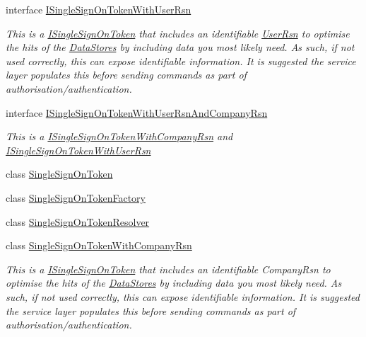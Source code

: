 \begin{DoxyCompactItemize}
interface \hyperlink{interfaceCqrs_1_1Authentication_1_1ISingleSignOnTokenWithUserRsn}{I\+Single\+Sign\+On\+Token\+With\+User\+Rsn}
\begin{DoxyCompactList}\small\item\em This is a \hyperlink{interfaceCqrs_1_1Authentication_1_1ISingleSignOnToken}{I\+Single\+Sign\+On\+Token} that includes an identifiable \hyperlink{interfaceCqrs_1_1Authentication_1_1ISingleSignOnTokenWithUserRsn_a3ba8dbde50e032ebc76c96a5ff40f47f}{User\+Rsn} to optimise the hits of the \hyperlink{}{Data\+Stores} by including data you most likely need. As such, if not used correctly, this can expose identifiable information. It is suggested the service layer populates this before sending commands as part of authorisation/authentication. \end{DoxyCompactList}\item 
interface \hyperlink{interfaceCqrs_1_1Authentication_1_1ISingleSignOnTokenWithUserRsnAndCompanyRsn}{I\+Single\+Sign\+On\+Token\+With\+User\+Rsn\+And\+Company\+Rsn}
\begin{DoxyCompactList}\small\item\em This is a \hyperlink{interfaceCqrs_1_1Authentication_1_1ISingleSignOnTokenWithCompanyRsn}{I\+Single\+Sign\+On\+Token\+With\+Company\+Rsn} and \hyperlink{interfaceCqrs_1_1Authentication_1_1ISingleSignOnTokenWithUserRsn}{I\+Single\+Sign\+On\+Token\+With\+User\+Rsn} \end{DoxyCompactList}\item 
class \hyperlink{classCqrs_1_1Authentication_1_1SingleSignOnToken}{Single\+Sign\+On\+Token}
\item 
class \hyperlink{classCqrs_1_1Authentication_1_1SingleSignOnTokenFactory}{Single\+Sign\+On\+Token\+Factory}
\item 
class \hyperlink{classCqrs_1_1Authentication_1_1SingleSignOnTokenResolver}{Single\+Sign\+On\+Token\+Resolver}
\item 
class \hyperlink{classCqrs_1_1Authentication_1_1SingleSignOnTokenWithCompanyRsn}{Single\+Sign\+On\+Token\+With\+Company\+Rsn}
\begin{DoxyCompactList}\small\item\em This is a \hyperlink{interfaceCqrs_1_1Authentication_1_1ISingleSignOnToken}{I\+Single\+Sign\+On\+Token} that includes an identifiable Company\+Rsn to optimise the hits of the \hyperlink{}{Data\+Stores} by including data you most likely need. As such, if not used correctly, this can expose identifiable information. It is suggested the service layer populates this before sending commands as part of authorisation/authentication. \end{DoxyCompactList}\item 

\end{DoxyCompactItemize}
